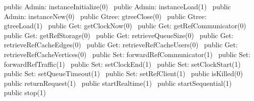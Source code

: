 public \LA{}Admin: instanceInitialize(0)~{\nwtagstyle{}}\RA{}
public \LA{}Admin: instanceLoad(1)~{\nwtagstyle{}}\RA{}
public \LA{}Admin: instanceNew(0)~{\nwtagstyle{}}\RA{}
public \LA{}Gtree: gtreeClose(0)~{\nwtagstyle{}}\RA{}
public \LA{}Gtree: gtreeLoad(1)~{\nwtagstyle{}}\RA{}
public \LA{}Get: getClockNow(0)~{\nwtagstyle{}}\RA{}
public \LA{}Get: getRefCommunicator(0)~{\nwtagstyle{}}\RA{}
public \LA{}Get: getRefStorage(0)~{\nwtagstyle{}}\RA{}
public \LA{}Get: retrieveQueueSize(0)~{\nwtagstyle{}}\RA{}
public \LA{}Get: retrieveRefCacheEdges(0)~{\nwtagstyle{}}\RA{}
public \LA{}Get: retrieveRefCacheUsers(0)~{\nwtagstyle{}}\RA{}
public \LA{}Get: retrieveRefCacheVertices(0)~{\nwtagstyle{}}\RA{}
public \LA{}Set: forwardRefCommunicator(1)~{\nwtagstyle{}}\RA{}
public \LA{}Set: forwardRefTraffic(1)~{\nwtagstyle{}}\RA{}
public \LA{}Set: setClockEnd(1)~{\nwtagstyle{}}\RA{}
public \LA{}Set: setClockStart(1)~{\nwtagstyle{}}\RA{}
public \LA{}Set: setQueueTimeout(1)~{\nwtagstyle{}}\RA{}
public \LA{}Set: setRefClient(1)~{\nwtagstyle{}}\RA{}
public \LA{}isKilled(0)~{\nwtagstyle{}}\RA{}
public \LA{}returnRequest(1)~{\nwtagstyle{}}\RA{}
public \LA{}startRealtime(1)~{\nwtagstyle{}}\RA{}
public \LA{}startSequential(1)~{\nwtagstyle{}}\RA{}
public \LA{}stop(1)~{\nwtagstyle{}}\RA{}
\nwendcode{}\nwdocspar

